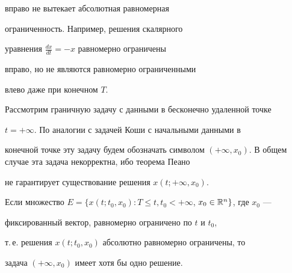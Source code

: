 вправо не вытекает абсолютная равномерная


ограниченность. Например, решения скалярного


уравнения $\frac{dx}{dt}=-x$ равномерно ограничены


вправо, но не являются равномерно ограниченными


влево даже при конечном $T$.





Рассмотрим граничную задачу с данными в бесконечно удаленной точке


$t=+\infty$. По аналогии с задачей Коши с начальными данными в


конечной точке эту задачу будем обозначать символом $( +\infty,


x_{0} )$. В общем случае эта задача некорректна, ибо теорема Пеано


не гарантирует существование решения $x(t;+\infty,x_{0})$.





\begin{thm}\label{T_2}


Если множество $E=\lbrace x(t;t_{0},x_{0}): T \leq t,


t_{0}<+\infty$, $x_{0} \in \R^{n}\rbrace$, где $x_{0}$ ---


фиксированный вектор, равномерно ограничено по $t$ и $t_{0}$,


т.\,е. решения $x(t;t_{0},x_{0})$ абсолютно равномерно ограничены, то


задача $( +\infty,x_{0} )$ имеет хотя бы одно решение.


\end{thm}





